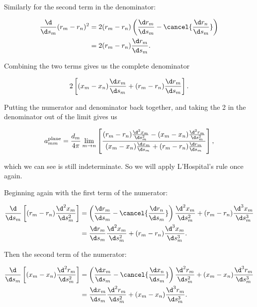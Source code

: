 \noindent Similarly for the second term in the denominator:

\begin{equation}
	\begin{aligned}
		\frac{\d}{\d s_m} (r_m-r_n)^2 &= 2(r_m-r_n)\left(\frac{\d r_m}{\d s_m}-\cancel{\frac{\d r_n}{\d s_m}}\right)\\
		&= 2(r_m-r_n)\frac{\d r_m}{\d s_m}.
	\end{aligned}
\end{equation}

\noindent Combining the two terms gives us the complete denominator

\begin{equation}
	2\left[(x_m-x_n)\frac{\d x_m}{\d s_m} + (r_m-r_n)\frac{\d r_m}{\d s_m}\right].
\end{equation}

Putting the numerator and denominator back together, and taking the 2 in the denominator out of the limit gives us

\begin{equation}
	a^\text{plane}_{mm} = \frac{d_m}{4 \pi} \lim_{m\rightarrow n} \left[\frac{(r_m-r_n)\frac{\d^2 x_m}{\d s_m^2} - (x_m-x_n)\frac{\d^2 r_m}{\d s_m^2}}{(x_m-x_n)\frac{\d x_m}{\d s_m} + (r_m-r_n)\frac{\d r_m}{\d s_m}}\right],
\end{equation}

\noindent which we can see is still indeterminate.
So we will apply L'Hospital's rule once again.

Beginning again with the first term of the numerator:

\begin{equation}
	\begin{aligned}
		\frac{\d}{\d s_m} \left[(r_m-r_n)\frac{\d^2 x_m}{\d s_m^2}\right] &= \left(\frac{\d r_m}{\d s_m} - \cancel{\frac{\d r_n}{\d s_m}}\right)\frac{\d^2 x_m}{\d s_m^2}+(r_m-r_n)\frac{\d^3 x_m}{\d s_m^3}\\
		&= \frac{\d r_m}{\d s_m} \frac{\d^2 x_m}{\d s_m^2}+(r_m-r_n)\frac{\d^3 x_m}{\d s_m^3}.
	\end{aligned}
\end{equation}

\noindent Then the second term of the numerator:

\begin{equation}
	\begin{aligned}
		\frac{\d}{\d s_m} \left[(x_m-x_n)\frac{\d^2 r_m}{\d s_m^2}\right] &= \left(\frac{\d x_m}{\d s_m} - \cancel{\frac{\d x_n}{\d s_m}}\right)\frac{\d^2 r_m}{\d s_m^2}+(x_m-x_n)\frac{\d^3 r_m}{\d s_m^3}\\
		&= \frac{\d x_m}{\d s_m} \frac{\d^2 r_m}{\d s_m^2}+(x_m-x_n)\frac{\d^3 r_m}{\d s_m^3}.
	\end{aligned}
\end{equation}

